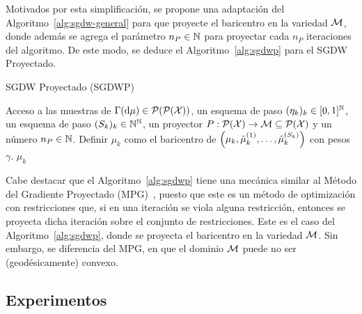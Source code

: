 Motivados por esta simplificación, se propone una adaptación del Algoritmo~\ref{alg:sgdw-general} para que proyecte el baricentro en la variedad $\Manifold$, donde además se agrega el parámetro $n_P\in\N$ para proyectar cada $n_P$ iteraciones del algoritmo. De este modo, se deduce el Algoritmo~\ref{alg:sgdwp} para el SGDW Proyectado.
\begin{algorithm}[H]
    \caption{SGDW Proyectado (SGDWP)}
    \label{alg:sgdwp}
    \begin{algorithmic}[1]
        \Require Acceso a las muestras de $\Gamma(\dd \mu) \in \ProbSpace[\ProbSpace]$, un esquema de paso $(\eta_k)_k \in [0, 1]^\N$, un esquema de paso $(S_k)_k \in \N^\N$, un proyector $P:\ProbSpace[\cX] \to \Manifold\subseteq \ProbSpace[\cX] $ y un número $n_P \in \N$.
        \Repeat
        \State Definir $\mu_k$ como el baricentro de $\qty( \mu_k, \tilde\mu_k^{(1)}, \dots, \tilde\mu_k^{(S_k)} )$ con pesos $\gamma$.
        \EndIf
        \State\Return $\mu_k$
    \end{algorithmic}
\end{algorithm}


Cabe destacar que el Algoritmo~\ref{alg:sgdwp} tiene una mecánica similar al Método del Gradiente Proyectado (MPG)~\cite[Secc. 5.1]{optimizacion2022amaya}, puesto que este es un método de optimización con restricciones que, si en una iteración se viola alguna restricción, entonces se proyecta dicha iteración sobre el conjunto de restricciones. Este es el caso del Algoritmo~\ref{alg:sgdwp}, donde se proyecta el baricentro en la variedad $\Manifold$. Sin embargo, se diferencia del MPG, en que el dominio $\Manifold$ puede no ser (geodésicamente) convexo.


\subsection{Experimentos}\label{ssec:sgdwp-experimentos}  %

